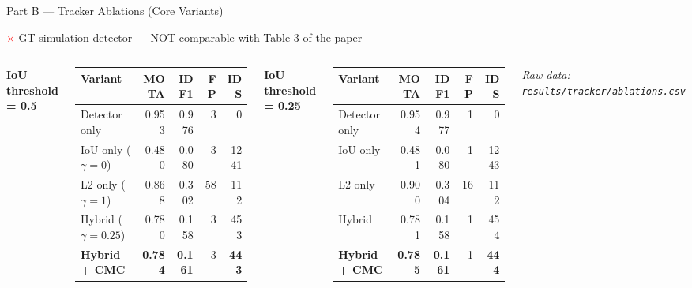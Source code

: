 \documentclass[aspectratio=169, 10pt]{beamer}
\newcommand{\no}{\textcolor{red}{\textbf{$\times$}}}
\newcommand{\best}[1]{\textbf{\textcolor{green!50!black}{#1}}}
\begin{document}
\begin{frame}{Part B — Tracker Ablations (Core Variants)}

  \begin{alertblock}{\no\; GT simulation detector — NOT comparable with Table 3 of the paper}
  \end{alertblock}

  \vspace{0.3em}

  \begin{columns}[T]


    \small
    \textbf{IoU threshold = 0.5}
    \vspace{0.2em}

    \begin{tabular}{lrrrr}
      \toprule
      Variant & MOTA & IDF1 & FP & IDS \\
      \midrule
      Detector only & 0.953 & 0.976 & 3 & 0 \\
      IoU only ($\gamma{=}0$) & 0.480 & 0.080 & 3 & 1241 \\
      L2 only ($\gamma{=}1$) & 0.868 & 0.302 & 58 & 112 \\
      Hybrid ($\gamma{=}0.25$) & 0.780 & 0.158 & 3 & 453 \\
      \best{Hybrid + CMC} & \best{0.784} & \best{0.161} & 3 & \best{443} \\
      \bottomrule
    \end{tabular}

    \vspace{0.5em}
    \textbf{IoU threshold = 0.25}
    \vspace{0.2em}

    \begin{tabular}{lrrrr}
      \toprule
      Variant & MOTA & IDF1 & FP & IDS \\
      \midrule
      Detector only & 0.954 & 0.977 & 1 & 0 \\
      IoU only & 0.481 & 0.080 & 1 & 1243 \\
      L2 only & 0.900 & 0.304 & 16 & 112 \\
      Hybrid & 0.781 & 0.158 & 1 & 454 \\
      \best{Hybrid + CMC} & \best{0.785} & \best{0.161} & 1 & \best{444} \\
      \bottomrule
    \end{tabular}

    \vspace{0.3em}
    \small\textit{Raw data: \texttt{results/tracker/ablations.csv}}


\end{columns}
\end{frame}
\end{document}
